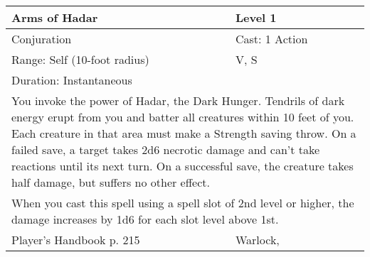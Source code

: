 \documentclass[11pt]{report}
\begin{document}
\begin{table}[H]
	\begin{tabular}{||p{6cm}|p{6cm}||}
		\hline\hline
		\bf{Arms of Hadar} & Level 1\\ \hline
		Conjuration & Cast: 1 Action\\ \hline
		Range: Self (10-foot radius) & V, S\\ \hline
		Duration: Instantaneous & \\ \hline
		\multicolumn{2}{||p{12cm}||}{You invoke the power of Hadar, the Dark Hunger. 
Tendrils of dark energy erupt from you and batter all creatures within 10 feet of you. Each creature in that area must make a Strength saving throw. On a failed save, a target takes 2d6 necrotic damage and can’t take reactions until its next turn. On a successful save, the creature takes half damage, but suffers no other effect.}\\ \hline
		\multicolumn{2}{||p{12cm}||}{When you cast this spell using a spell slot of 2nd level or higher, the damage increases by 1d6 for each slot level above 1st.}\\ \hline
Player's Handbook p. 215 & Warlock, \\ \hline\hline
	\end{tabular}
\end{table}
\end{document}
